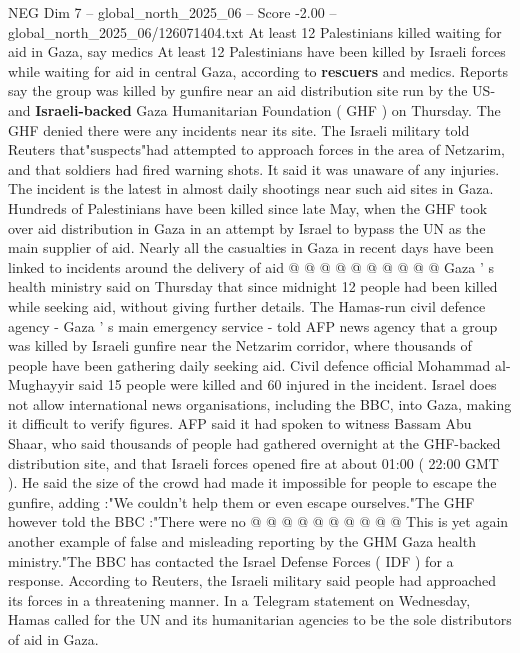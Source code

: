\begin{textsample}{NEG Dim 7 – global\_north\_2025\_06 – Score -2.00 – global\_north\_2025\_06/126071404.txt}  \label{ex:f7_neg_072}
At least 12 Palestinians killed waiting for aid in Gaza, say medics At least 12 Palestinians have been killed by Israeli forces while waiting for aid in central Gaza, according to \textbf{rescuers} and medics.
Reports say the group was killed by gunfire near an aid distribution site run by the US- and \textbf{Israeli-backed} Gaza Humanitarian Foundation ( GHF ) on Thursday.
The GHF denied there were any incidents near its site.
The Israeli military told Reuters that"suspects"had attempted to approach forces in the area of Netzarim, and that soldiers had fired warning shots.
It said it was unaware of any injuries.
The incident is the latest in almost daily shootings near such aid sites in Gaza.
Hundreds of Palestinians have been killed since late May, when the GHF took over aid distribution in Gaza in an attempt by Israel to bypass the UN as the main supplier of aid.
Nearly all the casualties in Gaza in recent days have been linked to incidents around the delivery of aid @ @ @ @ @ @ @ @ @ @ Gaza ' s health ministry said on Thursday that since midnight 12 people had been killed while seeking aid, without giving further details.
The Hamas-run civil defence agency - Gaza ' s main emergency service - told AFP news agency that a group was killed by Israeli gunfire near the Netzarim corridor, where thousands of people have been gathering daily seeking aid.
Civil defence official Mohammad al-Mughayyir said 15 people were killed and 60 injured in the incident.
Israel does not allow international news organisations, including the BBC, into Gaza, making it difficult to verify figures.
AFP said it had spoken to witness Bassam Abu Shaar, who said thousands of people had gathered overnight at the GHF-backed distribution site, and that Israeli forces opened fire at about 01:00 ( 22:00 GMT ).
He said the size of the crowd had made it impossible for people to escape the gunfire, adding :"We couldn't help them or even escape ourselves."The GHF however told the BBC :"There were no @ @ @ @ @ @ @ @ @ @ This is yet again another example of false and misleading reporting by the GHM Gaza health ministry."The BBC has contacted the Israel Defense Forces ( IDF ) for a response.
According to Reuters, the Israeli military said people had approached its forces in a threatening manner.
In a Telegram statement on Wednesday, Hamas called for the UN and its humanitarian agencies to be the sole distributors of aid in Gaza.

\end{textsample}
